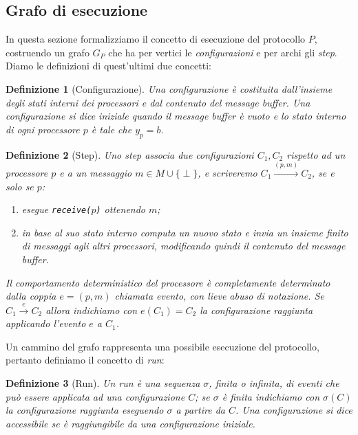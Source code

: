 \documentclass{article}
\newtheorem{definizione}{Definizione}
\begin{document}
\subsection{Grafo di esecuzione}

In questa sezione formalizziamo il concetto di esecuzione del
protocollo $P$, costruendo un grafo $G_P$ che ha per vertici le
\emph{configurazioni} e per archi gli \emph{step}. Diamo le
definizioni di quest'ultimi due concetti:

\begin{definizione}[Configurazione]
  Una \emph{configurazione} \`e costituita dall'insieme degli stati
  interni dei processori e dal contenuto del message buffer. Una
  configurazione si dice \emph{iniziale} quando il message buffer è
  vuoto e lo stato interno di ogni processore $p$ è tale che $y_p =
  b$.
\end{definizione}

\begin{definizione}[Step]
  Uno \emph{step} associa due configurazioni $C_1, C_2$ rispetto ad un
  processore $p$ e a un messaggio $m \in M\cup\{\perp\}$, e
  scriveremo $C_1 \xrightarrow{(p,m)} C_2$, se e solo
  se $p$:
  \begin{enumerate}
  \item esegue \texttt{receive($p$)} ottenendo $m$;
  \item in base al suo stato interno computa un nuovo stato e invia un
    insieme finito di messaggi agli altri processori, modificando
    quindi il contenuto del message buffer.
  \end{enumerate} 
  Il comportamento deterministico del processore è completamente
  determinato dalla coppia $e=(p,m)$ chiamata evento, con lieve abuso
  di notazione. Se $C_1 \xrightarrow{e} C_2$ allora indichiamo con
  $e(C_1)=C_2$ la configurazione raggiunta applicando l'evento $e$ a
  $C_1$.
\end{definizione}

Un cammino del grafo rappresenta una possibile esecuzione del
protocollo, pertanto definiamo il concetto di \emph{run}:

\begin{definizione}[Run]
  Un \emph{run} è una sequenza $\sigma$, finita o infinita, di eventi
  che può essere applicata ad una configurazione $C$; se $\sigma$ è
  finita indichiamo con $\sigma(C)$ la configurazione raggiunta
  eseguendo $\sigma$ a partire da $C$. Una configurazione si dice
  \emph{accessibile} se \`e raggiungibile da una configurazione
  iniziale.
\end{definizione}
\end{document}

